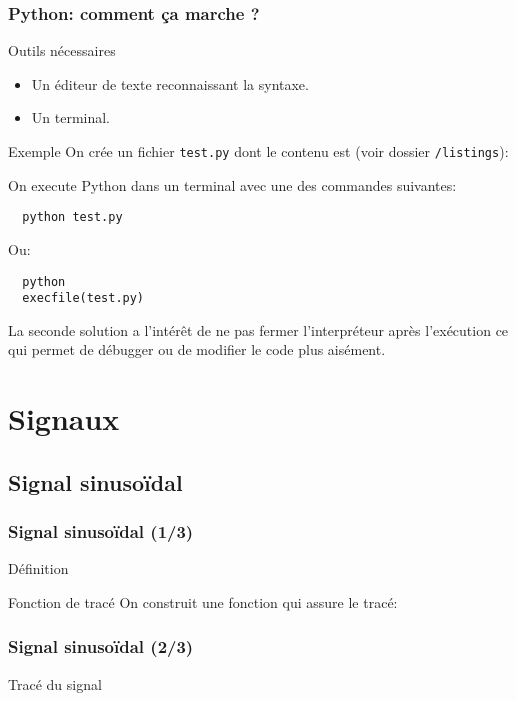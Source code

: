 \documentclass[8pt,a4paper]{beamer}
\begin{document}
  \begin{frame}[containsverbatim]
  \frametitle{Python: comment ça marche ?}
  \begin{block}{Outils nécessaires}
  \begin{itemize}
  \item Un éditeur de texte reconnaissant la syntaxe.
  \item Un terminal.
  \end{itemize}
  \end{block}
  \begin{block}{Exemple}
  On crée un fichier \lstinline!test.py! dont le contenu est (voir dossier  \lstinline!/listings!):    
  
  On execute Python dans un terminal avec une des commandes suivantes:
  \begin{lstlisting}
  python test.py
  \end{lstlisting}
  Ou:
  \begin{lstlisting}
  python 
  execfile(test.py)
  \end{lstlisting}
  La seconde solution a l'intérêt de ne pas fermer l'interpréteur après l'exécution ce qui permet de débugger ou de modifier le code plus aisément.
  \end{block}
  

  

  \end{frame}
\section{Signaux}
  \subsection{Signal sinusoïdal}
  
  \begin{frame}[containsverbatim]
  \frametitle{Signal sinusoïdal (1/3)}
 \begin{block}{Définition} 
 
 \end{block}
  
  \begin{block}{Fonction de tracé} 
  On construit une fonction qui assure le tracé:
  
  \end{block}
  \end{frame}
  
  \begin{frame}[containsverbatim]
  \frametitle{Signal sinusoïdal (2/3)}
  \begin{block}{Tracé du signal} 
  
  \end{block}
  \end{frame}
  
\end{document}
